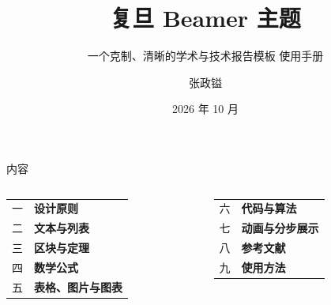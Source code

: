 \documentclass[aspectratio=169,10pt]{beamer}
\title[Fudan Beamer]{复旦 Beamer 主题}
\subtitle{一个克制、清晰的学术与技术报告模板 \quad 使用手册}
\author{张政镒}
\institute{复旦大学}
\date{2026 年 10 月}
\begin{document}
\begin{frame}[plain]\titlepage\end{frame}

\begin{frame}{内容}
  \vspace{3mm}
  \begin{columns}[T,onlytextwidth]
      \renewcommand{\arraystretch}{1.6}
      \begin{tabular}{@{}l l@{}}
        {\rmfamily\color{accent}一} & \textbf{设计原则} \\
        {\rmfamily\color{accent}二} & \textbf{文本与列表} \\
        {\rmfamily\color{accent}三} & \textbf{区块与定理} \\
        {\rmfamily\color{accent}四} & \textbf{数学公式} \\
        {\rmfamily\color{accent}五} & \textbf{表格、图片与图表} \\
      \end{tabular}
      \renewcommand{\arraystretch}{1.6}
      \begin{tabular}{@{}l l@{}}
        {\rmfamily\color{accent}六} & \textbf{代码与算法} \\
        {\rmfamily\color{accent}七} & \textbf{动画与分步展示} \\
        {\rmfamily\color{accent}八} & \textbf{参考文献} \\
        {\rmfamily\color{accent}九} & \textbf{使用方法} \\
      \end{tabular}
  \end{columns}
\end{frame}

\end{document}
